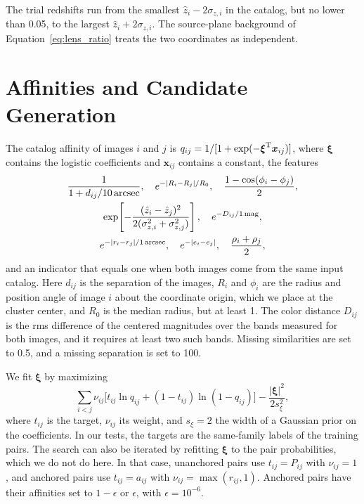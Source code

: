\documentclass[twocolumn,twocolappendix,linenumbers]{aastex701}
\begin{document}
The trial redshifts run from the smallest $\hat z_i-2\sigma_{z,i}$ in the catalog, but no lower than 0.05, to the largest $\hat z_i+2\sigma_{z,i}$.
The source-plane background of Equation~\ref{eq:lens_ratio} treats the two coordinates as independent.

\section{Affinities and Candidate Generation}
\label{app:search}
\setcounter{equation}{0}
The catalog affinity of images $i$ and $j$ is $q_{ij}=1/[1+\exp(-\boldsymbol\xi^{\rm T}\boldsymbol x_{ij})]$, where $\boldsymbol\xi$ contains the logistic coefficients and $\boldsymbol x_{ij}$ contains a constant, the features
\begin{equation}
\begin{gathered}
\frac{1}{1+d_{ij}/10\,{\rm arcsec}},\quad
e^{-|R_i-R_j|/R_0},\quad
\frac{1-\cos(\phi_i-\phi_j)}{2},\\
\exp\!\left[-\frac{(\hat z_i-\hat z_j)^2}{2(\sigma_{z,i}^2+\sigma_{z,j}^2)}\right],\quad
e^{-D_{ij}/1\,{\rm mag}},\\
e^{-|r_i-r_j|/1\,{\rm arcsec}},\quad
e^{-|e_i-e_j|},\quad
\frac{\rho_i+\rho_j}{2},
\end{gathered}
\label{eq:features}
\end{equation}
and an indicator that equals one when both images come from the same input catalog.
Here $d_{ij}$ is the separation of the images, $R_i$ and $\phi_i$ are the radius and position angle of image $i$ about the coordinate origin, which we place at the cluster center, and $R_0$ is the median radius, but at least 1\arcsec.
The color distance $D_{ij}$ is the rms difference of the centered magnitudes over the bands measured for both images, and it requires at least two such bands.
Missing similarities are set to 0.5, and a missing separation is set to 100\arcsec.

We fit $\boldsymbol\xi$ by maximizing
\begin{equation*}
\sum_{i<j}\nu_{ij}\big[t_{ij}\ln q_{ij}+(1-t_{ij})\ln(1-q_{ij})\big]-\frac{|\boldsymbol\xi|^2}{2s_\xi^2},
\end{equation*}
where $t_{ij}$ is the target, $\nu_{ij}$ its weight, and $s_\xi=2$ the width of a Gaussian prior on the coefficients.
In our tests, the targets are the same-family labels of the training pairs.
The search can also be iterated by refitting $\boldsymbol\xi$ to the pair probabilities, which we do not do here.
In that case, unanchored pairs use $t_{ij}=P_{ij}$ with $\nu_{ij}=1$, and anchored pairs use $t_{ij}=a_{ij}$ with $\nu_{ij}=\max(r_{ij},1)$.
Anchored pairs have their affinities set to $1-\epsilon$ or $\epsilon$, with $\epsilon=10^{-6}$.
\end{document}
